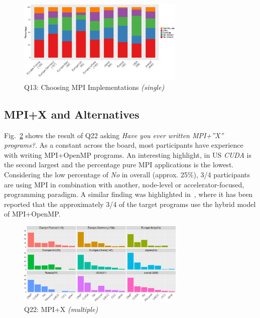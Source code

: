 \documentclass[preprint,5p,times]{elsarticle}
\def\myquote#1{{\it #1}}
\newcommand{\revision}[2]{{\color{blue}#2}}
\begin{document}

  \begin{figure}[tb]
    \begin{center}
      \includegraphics[width=8.0cm]{R-scripts/Q13.pdf}
      \caption{Q13: Choosing MPI Implementations {\it(single)}}
      \label{fig:choosing-implementation}
\vspace{-3mm}%
    \end{center}
  \end{figure}

\subsection{MPI+X and Alternatives}

Fig.~\ref{fig:mpi-x} shows the result of Q22 asking \myquote{Have you ever
written MPI+''X'' programs?}. As a constant across the board, most participants
have \revision{experienced}{experience with} writing MPI+OpenMP programs. An interesting highlight, in US
\myquote{CUDA} is the second largest and the percentage pure MPI applications is
the lowest. Considering the low percentage of \myquote{No} in overall (approx.
25\%), 3/4 participants are using MPI in combination with another, node-level or
accelerator-focused, programming paradigm. A similar finding was highlighted
in~\cite{10.1145/3295500.3356176}, where it has been reported that the
approximately 3/4 of the target programs use the hybrid model of MPI+OpenMP.

\begin{figure}[tb]
\begin{center}
\includegraphics[width=8.0cm]{R-scripts/Q22.pdf}
\caption{Q22: MPI+X {\it(multiple)}}
\label{fig:mpi-x}
\vspace{-3mm}%
\end{center}
\end{figure}
\end{document}
